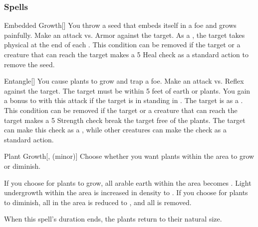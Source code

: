 \subsubsection{Spells}


\lowercase{\hypertarget{spell:Embedded Growth}{}}\label{spell:Embedded Growth}
\begin{freeability}[\nth{1}]{\hypertarget{spell:Embedded Growth}{Embedded Growth}}[]
You throw a seed that embeds itself in a foe and grows painfully.
Make an attack vs. Armor against the target.
\hit As a , the target takes physical  at the end of each .
This condition can be removed if the target or a creature that can reach the target makes a  5 Heal check as a standard action to remove the seed.
\end{freeability}
\vspace{0.25em}



\lowercase{\hypertarget{spell:Entangle}{}}\label{spell:Entangle}
\begin{freeability}[\nth{1}]{\hypertarget{spell:Entangle}{Entangle}}[]
You cause plants to grow and trap a foe.
Make an attack vs. Reflex against the target.
The target must be within 5 feet of earth or plants.
You gain a  bonus to  with this attack if the target is in standing in .
\hit The target is  as a .
This condition can be removed if the target or a creature that can reach the target makes a  5 Strength check break the target free of the plants.
The target can make this check as a , while other creatures can make the check as a standard action.
\end{freeability}
\vspace{0.25em}



\lowercase{\hypertarget{spell:Plant Growth}{}}\label{spell:Plant Growth}
\begin{freeability}[\nth{1}]{\hypertarget{spell:Plant Growth}{Plant Growth}}[,  (minor)]
Choose whether you want plants within the area to grow or diminish.

If you choose for plants to grow, all arable earth within the area becomes .
Light undergrowth within the area is increased in density to .
If you choose for plants to diminish, all  in the area is reduced to , and all  is removed.

When this spell's duration ends, the plants return to their natural size.
\end{freeability}
\vspace{0.25em}



